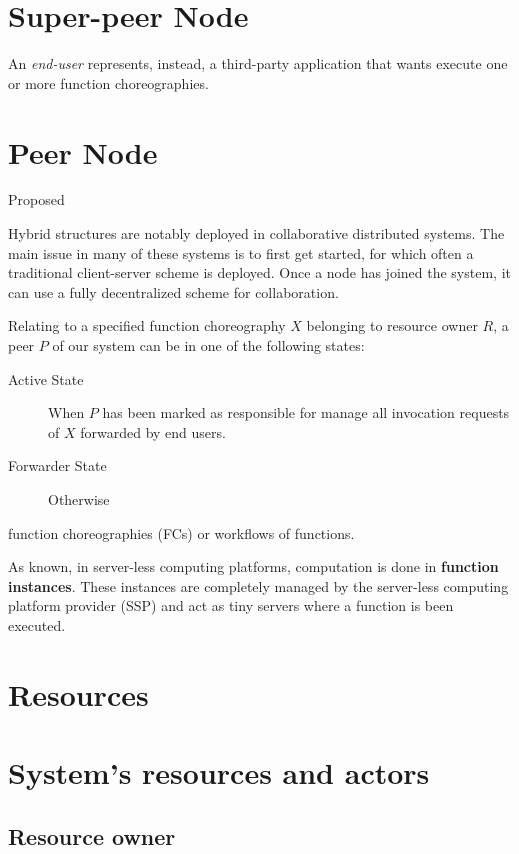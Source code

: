 \documentclass[10pt,a4paper]{article}
\begin{document}
\section{Super-peer Node}


An \textit{end-user} represents, instead, a third-party application that wants execute  one or more function choreographies.

\section{Peer Node}

Proposed 

Hybrid structures are notably deployed in collaborative distributed systems.
The main issue in many of these systems is to first get started, for which often
a traditional client-server scheme is deployed. Once a node has joined the
system, it can use a fully decentralized scheme for collaboration.


Relating to a specified function choreography $X$ belonging to resource owner $R$, a peer $P$ of our system can be in one of the following states:

\begin{description}
\item[Active State] When $P$ has been marked as responsible for manage all invocation requests of $X$ forwarded by end users.
\item[Forwarder State] Otherwise
\end{description}


function choreographies (FCs) or workflows of
functions. 

As known, in server-less computing platforms, computation is done in \textbf{function instances}. These instances are completely managed by the server-less computing platform provider (SSP) and act as tiny servers where a function is been executed.


\section{Resources}





\section{System's resources and actors}

\subsection{Resource owner}
\end{document}
